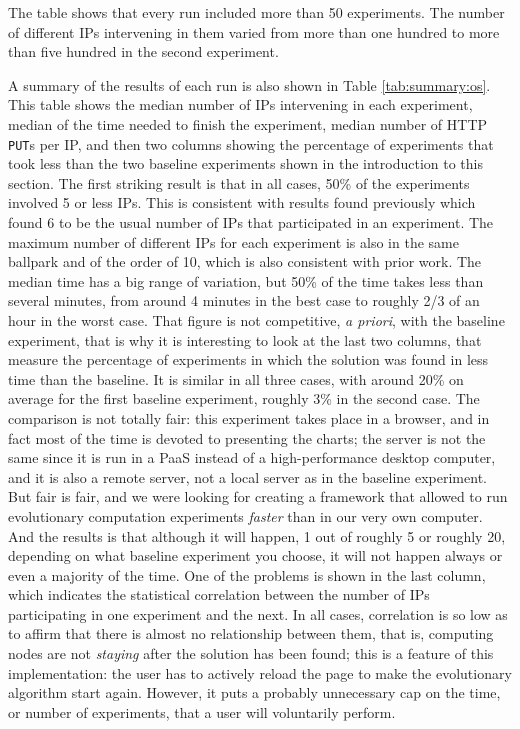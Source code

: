 \documentclass[journal,onecolumn]{IEEEtran}
\begin{document}
%
The table shows that every run included more than 50 experiments. The
number of different IPs intervening in them varied from more than one
hundred to more than five hundred in the second experiment.

A summary of the results of each run is also shown in Table
\ref{tab:summary:os}. This table shows the median number of IPs
intervening in each experiment,  median of the time needed
to finish the experiment, median number of HTTP {\tt PUT}s per IP, and
then two columns showing the percentage of experiments that took less
than the two baseline experiments shown in the introduction to this
section. The first striking result is that in all cases, 50\% of the
experiments involved 5 or less IPs. This is consistent with results
found previously \cite{DBLP:conf/gecco/GuervosG15} which found 6 to be
the usual number of IPs that participated in an experiment. The
maximum number of different IPs for each experiment is also in the
same ballpark and of the order of 10, which is also consistent with
prior work. The median time has a big range of variation, but 50\% of
the time takes less than several minutes, from around 4 minutes in the
best case to roughly 2/3 of an hour in the worst case. That figure is
not competitive, {\em a priori}, with the baseline experiment, that is
why it is interesting to look at the last two columns, that measure
the percentage of experiments in which the solution was found in less
time than the baseline. It is similar in all three cases, with around
20\% on average for the first baseline experiment, roughly 3\% in the
second case. The comparison is not totally fair: this experiment takes
place in a browser, and in fact most of the time is devoted to
presenting the charts; the server is not the same since it is run in a
PaaS instead of a high-performance desktop computer, and it is also a
remote server, not a local server as in the baseline experiment. But
fair is fair, and we were looking for creating a framework that
allowed to run evolutionary computation experiments {\em faster} than
in our very own computer. And the results is that although it will
happen, 1 out of roughly 5 or roughly 20, depending on what baseline
experiment you choose, it will not happen always or even a majority of
the time. One of the problems is shown in the last column, which
indicates the statistical correlation between the number of IPs
participating in one experiment and the next. In all cases,
correlation is so low as to affirm that there is almost no
relationship between them, that is, computing nodes are not {\em
  staying} after the solution has been found; this is a feature of
this implementation: the user has to actively reload the page to make
the evolutionary algorithm start again. However, it puts a probably
unnecessary cap on the time, or number of experiments, that a user
will voluntarily perform.
\end{document}
